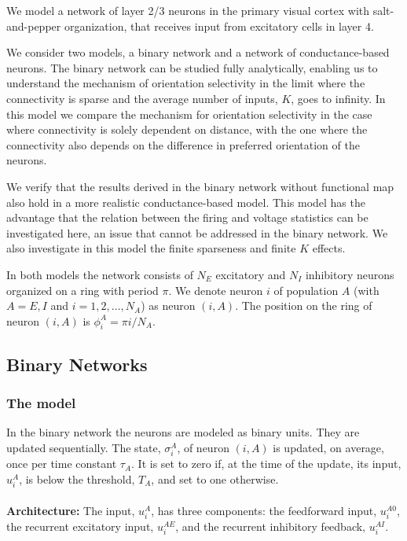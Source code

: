 We model a network of layer 2/3 neurons in the primary visual cortex with salt-and-pepper
organization, that receives input from excitatory cells in layer 4. 

We consider two models, a binary network and a network of conductance-based
neurons. The binary network can be studied fully analytically, enabling us to 
understand the mechanism of orientation selectivity in the limit where the 
connectivity is sparse and the average number of inputs, $K$, goes to infinity.
In this model we compare the mechanism for orientation selectivity in the
case where connectivity is solely dependent on distance, with the one where
the connectivity also depends on the difference in preferred orientation of 
the neurons.

We verify that the results derived in the binary network without functional
map also hold in a more realistic conductance-based model. This model has the 
advantage that the relation between the firing and voltage statistics 
can be investigated here, an issue that cannot be addressed in the binary network.
We also investigate in this model the finite sparseness and finite $K$ effects. 
 
In both models the network consists of $N_E$ excitatory and $N_I$ inhibitory 
neurons organized on a ring with  period $\pi$\@. We denote neuron $i$ of 
population $A$ (with $A=E,I$ and $i=1,2,\ldots,N_A$) as neuron $(i,A)$. 
The position on the ring of neuron $(i,A)$ is $\phi_i^A=\pi i/N_A$.

\subsection*{Binary Networks}
\subsubsection*{The model}
In the binary network the neurons are modeled as binary units. They are 
updated sequentially. The state, $\sigma_i^A$, of neuron $(i,A)$ is updated, 
on average, once per time constant $\tau_A$\@. It is set to zero if, at the 
time of the update, its input, $u_i^A$, is below the threshold, $T_A$, 
and set to one otherwise. \\
 \\
{\noindent \bf Architecture:} The input, $u_i^A$, has three 
components: the feedforward input, $u_i^{A0}$, the recurrent excitatory input, 
$u_i^{AE}$, and the recurrent inhibitory feedback, $u_i^{AI}$\@. 

